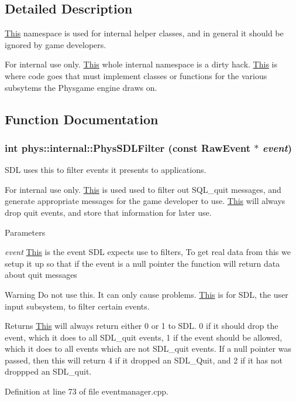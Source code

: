 \subsection{Detailed Description}
\hyperlink{structThis}{This} namespace is used for internal helper classes, and in general it should be ignored by game developers. \begin{DoxyInternal}{For internal use only.}
\hyperlink{structThis}{This} whole internal namespace is a dirty hack. \hyperlink{structThis}{This} is where code goes that must implement classes or functions for the various subsytems the Physgame engine draws on. \end{DoxyInternal}


\subsection{Function Documentation}
\hypertarget{namespacephys_1_1internal_aae2a1133a05c67ac3062038c0c5dad4a}{
\subsubsection[{PhysSDLFilter}]{\setlength{\rightskip}{0pt plus 5cm}int phys::internal::PhysSDLFilter (const RawEvent $\ast$ {\em event})}}
\label{d0/d26/namespacephys_1_1internal_aae2a1133a05c67ac3062038c0c5dad4a}


SDL uses this to filter events it presents to applications. 

\begin{DoxyInternal}{For internal use only.}
\hyperlink{structThis}{This} is used used to filter out SQL\_\-quit messages, and generate appropriate messages for the game developer to use. \hyperlink{structThis}{This} will always drop quit events, and store that information for later use. 
\begin{DoxyParams}{Parameters}
\item[{\em event}]\hyperlink{structThis}{This} is the event SDL expects use to filters, To get real data from this we setup it up so that if the event is a null pointer the function will return data about quit messages \end{DoxyParams}
\begin{DoxyWarning}{Warning}
Do not use this. It can only cause problems. \hyperlink{structThis}{This} is for SDL, the user input subsystem, to filter certain events. 
\end{DoxyWarning}
\begin{DoxyReturn}{Returns}
\hyperlink{structThis}{This} will always return either 0 or 1 to SDL. 0 if it should drop the event, which it does to all SDL\_\-quit events, 1 if the event should be allowed, which it does to all events which are not SDL\_\-quit events. If a null pointer was passed, then this will return 4 if it dropped an SDL\_\-Quit, and 2 if it has not droppped an SDL\_\-quit. 
\end{DoxyReturn}
\end{DoxyInternal}


Definition at line 73 of file eventmanager.cpp.

